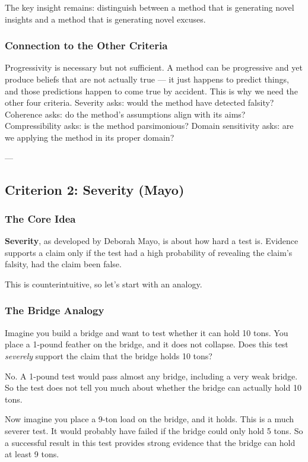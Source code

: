 \documentclass[11pt,letterpaper]{article}
\begin{document}
The key insight remains: distinguish between a method that is generating novel insights and a method that is generating novel excuses.

\subsubsection*{Connection to the Other Criteria}

Progressivity is necessary but not sufficient. A method can be progressive and yet produce beliefs that are not actually true — it just happens to predict things, and those predictions happen to come true by accident. This is why we need the other four criteria. Severity asks: would the method have detected falsity? Coherence asks: do the method's assumptions align with its aims? Compressibility asks: is the method parsimonious? Domain sensitivity asks: are we applying the method in its proper domain?

---

\newpage

\subsection{Criterion 2: Severity (Mayo)}

\subsubsection*{The Core Idea}

\textbf{Severity}, as developed by Deborah Mayo, is about how hard a test is. Evidence supports a claim only if the test had a high probability of revealing the claim's falsity, had the claim been false.

This is counterintuitive, so let's start with an analogy.

\subsubsection*{The Bridge Analogy}

Imagine you build a bridge and want to test whether it can hold 10 tons. You place a 1-pound feather on the bridge, and it does not collapse. Does this test \emph{severely} support the claim that the bridge holds 10 tons?

No. A 1-pound test would pass almost any bridge, including a very weak bridge. So the test does not tell you much about whether the bridge can actually hold 10 tons.

Now imagine you place a 9-ton load on the bridge, and it holds. This is a much severer test. It would probably have failed if the bridge could only hold 5 tons. So a successful result in this test provides strong evidence that the bridge can hold at least 9 tons.
\end{document}
